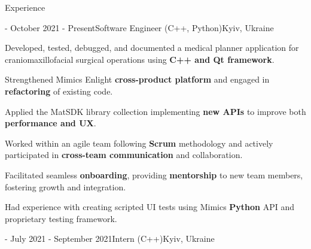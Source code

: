 \documentclass[11pt]{resume}
\begin{document}
    \hspace*{\fill}
    \hspace*{\fill}
    \hspace*{\fill}
    \hspace*{\fill}

    \begin{rSection}{Experience}
    	\begin{rSubsection}
            {\href{https://www.materialise.com/en}{\color{blue}\underline{}} - \href{https://www.materialise.com/en/healthcare/mimics-enlight-cmf}{\color{blue}\underline{}}}{October 2021 - Present}{Software Engineer (C++, Python)}{Kyiv, Ukraine}
            
            \item Developed, tested, debugged, and documented a medical planner application for craniomaxillofacial surgical operations using \textbf{C++ and Qt framework}.
            \item Strengthened Mimics Enlight \textbf{cross-product platform} and engaged in \textbf{refactoring} of existing code.
    		\item Applied the MatSDK library collection implementing \textbf{new APIs} to improve both \textbf{performance and UX}.
            \item Worked within an agile team following \textbf{Scrum} methodology and actively participated in \textbf{cross-team communication} and collaboration.
            \item Facilitated seamless \textbf{onboarding}, providing \textbf{mentorship} to new team members, fostering growth and integration.
            \item Had experience with creating scripted UI tests using Mimics \textbf{Python} API and proprietary testing framework.
    	\end{rSubsection}

        \begin{rSubsection}
            {\href{https://www.materialise.com/en}{\color{blue}\underline{}} - \href{https://www.materialise.com/en/careers/students-graduates/internships}{\color{blue}\underline{}}}{July 2021 - September 2021}{Intern (C++)}{Kyiv, Ukraine}
            

\end{rSubsection}
\end{rSection}
\end{document}

